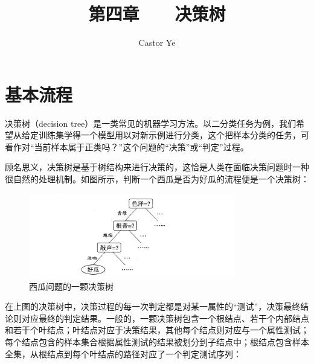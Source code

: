 \documentclass[12pt, a4paper]{article} %
\title{第四章 \ \ \ 决策树} %
\author{Castor Ye} %
\date{} %
\begin{document}
\maketitle %
\newtheorem{definition}{定义}[section]
\newtheorem{theorem}{定理}[section]
\newtheorem{example}{例}[section]
\newtheorem{solution}{题解}
\newtheorem{algorithm}{算法}
\newtheorem{axiom}{公理}
\newtheorem{property}{性质}
\newtheorem{proposition}{命题}
\newtheorem{lemma}{引理}
\newtheorem{corollary}{推论}[section]
\newtheorem{remark}{注解}
\newtheorem{condition}{条件}
\newtheorem{conclusion}{结论}
\newtheorem{assumption}{假设}
\renewcommand{\figurename}{图} %
\renewcommand{\tablename}{表} %
\section{基本流程}

决策树（decision tree）是一类常见的机器学习方法。以二分类任务为例，我们希望从给定训练集学得一个模型用以对新示例进行分类，这个把样本分类的任务，可看作对“当前样本属于正类吗？”这个问题的“决策”或“判定”过程。

顾名思义，决策树是基于树结构来进行决策的，这恰是人类在面临决策问题时一种很自然的处理机制。如图所示，判断一个西瓜是否为好瓜的流程便是一个决策树：

\begin{figure}[H]
    \centering
    \includegraphics[width=0.8\textwidth]{../img/4-1-西瓜问题的一颗决策树.png}
    \caption{西瓜问题的一颗决策树}
    \label{fig:西瓜问题的一颗决策树}
\end{figure}

在上图的决策树中，决策过程的每一次判定都是对某一属性的“测试”，决策最终结论则对应最终的判定结果。一般的，一颗决策树包含一个根结点、若干个内部结点和若干个叶结点；叶结点对应于决策结果，其他每个结点则对应与一个属性测试；每个结点包含的样本集合根据属性测试的结果被划分到子结点中；根结点包含样本全集，从根结点到每个叶结点的路径对应了一个判定测试序列：
\end{document}
